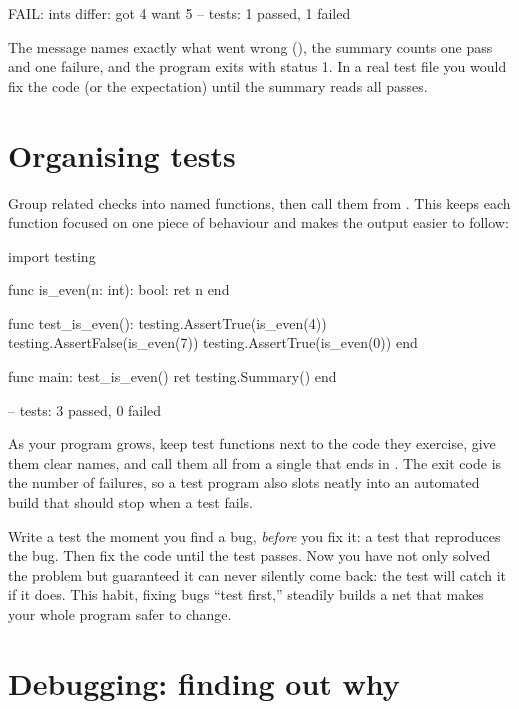 \begin{progout}
FAIL: ints differ: got 4 want 5
--
tests: 1 passed, 1 failed
\end{progout}

The message names exactly what went wrong (), the
summary counts one pass and one failure, and the program exits with status 1. In a real test file you would fix the
code (or the expectation) until the summary reads all passes.

\section{Organising tests}

Group related checks into named functions, then call them from . This
keeps each function focused on one piece of behaviour and makes the output easier
to follow:

\begin{salamen}
import testing

func is_even(n: int): bool:
    ret n %
end

func test_is_even():
    testing.AssertTrue(is_even(4))
    testing.AssertFalse(is_even(7))
    testing.AssertTrue(is_even(0))
end

func main:
    test_is_even()
    ret testing.Summary()
end
\end{salamen}

\begin{progout}
--
tests: 3 passed, 0 failed
\end{progout}

As your program grows, keep test functions next to the code they exercise, give
them clear  names, and call them all from a single  that
ends in . The exit code is the number of failures,
so a test program also slots neatly into an automated build that should stop when
a test fails.

\begin{tip}
Write a test the moment you find a bug, \emph{before} you fix it: a test that
reproduces the bug. Then fix the code until the test passes. Now you have not only
solved the problem but guaranteed it can never silently come back: the test will
catch it if it does. This habit, fixing bugs ``test first,'' steadily builds a net
that makes your whole program safer to change.
\end{tip}

\section{Debugging: finding out why}

